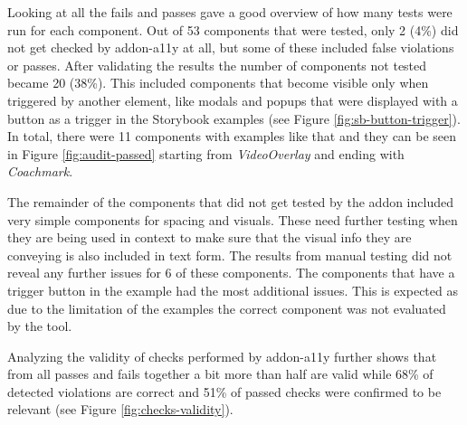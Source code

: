 \documentclass{master_thesis}
\begin{document}
Looking at all the fails and passes gave a good overview of how many tests were run for each component. Out of 53 components that were tested, only 2 (4\%) did not get checked by addon-a11y at all, but some of these included false violations or passes. After validating the results the number of components not tested became 20 (38\%). This included components that become visible only when triggered by another element, like modals and popups that were displayed with a button as a trigger in the Storybook examples (see Figure \ref{fig:sb-button-trigger}). In total, there were 11 components with examples like that and they can be seen in Figure \ref{fig:audit-passed} starting from \textit{VideoOverlay} and ending with \textit{Coachmark}.

The remainder of the components that did not get tested by the addon included very simple components for spacing and visuals. These need further testing when they are being used in context to make sure that the visual info they are conveying is also included in text form. The results from manual testing did not reveal any further issues for 6 of these components. The components that have a trigger button in the example had the most additional issues. This is expected as due to the limitation of the examples the correct component was not evaluated by the tool.

Analyzing the validity of checks performed by addon-a11y further shows that from all passes and fails together a bit more than half are valid while 68\% of detected violations are correct and 51\% of passed checks were confirmed to be relevant (see Figure \ref{fig:checks-validity}).
\end{document}
